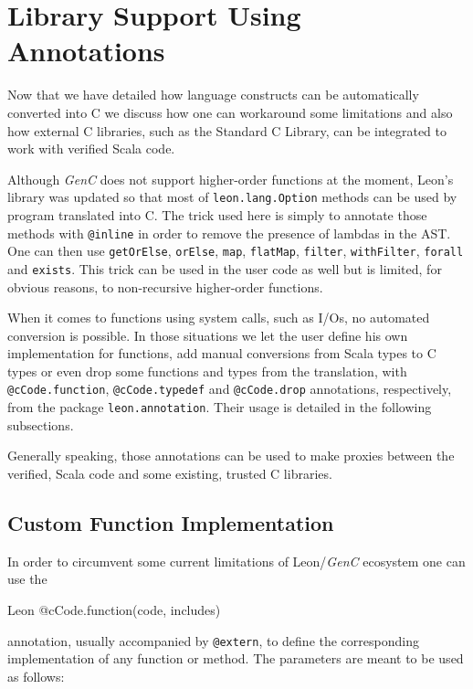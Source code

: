 \documentclass[a4paper,twoside]{article}
\newcommand{\InlineS}[1]{\lstinline[language=Leon]|#1|}
\let\oldsection\section
\renewcommand\section{\cleardoublepage\oldsection}
\newcommand{\GenC}{\emph{GenC}\xspace}
\begin{document}
\section{Library Support Using Annotations}
\label{library}

Now that we have detailed how language constructs can be automatically converted
into C we discuss how one can workaround some limitations and also how external
C libraries, such as the Standard C Library, can be integrated to work with
verified Scala code.


Although \GenC does not support higher-order functions at the moment, Leon's
library was updated so that most of \InlineS{leon.lang.Option} methods can be
used by program translated into C. The trick used here is simply to annotate
those methods with \InlineS{@inline} in order to remove the presence of lambdas
in the AST.  One can then use \InlineS{getOrElse}, \InlineS{orElse},
\InlineS{map}, \InlineS{flatMap}, \InlineS{filter}, \InlineS{withFilter},
\InlineS{forall} and \InlineS{exists}. This trick can be used in the user code
as well but is limited, for obvious reasons, to non-recursive higher-order
functions.

When it comes to functions using system calls, such as I/Os, no automated
conversion is possible. In those situations we let the user define his own
implementation for functions, add manual conversions from Scala types to C types
or even drop some functions and types from the translation, with
\InlineS{@cCode.function}, \InlineS{@cCode.typedef} and \InlineS{@cCode.drop}
annotations, respectively, from the package \InlineS{leon.annotation}. Their
usage is detailed in the following subsections.

Generally speaking, those annotations can be used to make proxies between the
verified, Scala code and some existing, trusted C libraries.

\subsection{Custom Function Implementation}

In order to circumvent some current limitations of Leon/\GenC ecosystem one can
use the
\begin{ShortCode}{Leon}
@cCode.function(code, includes)
\end{ShortCode}
annotation, usually accompanied by \InlineS{@extern}, to define the
corresponding implementation of any function or method. The parameters are meant
to be used as follows:
\end{document}

